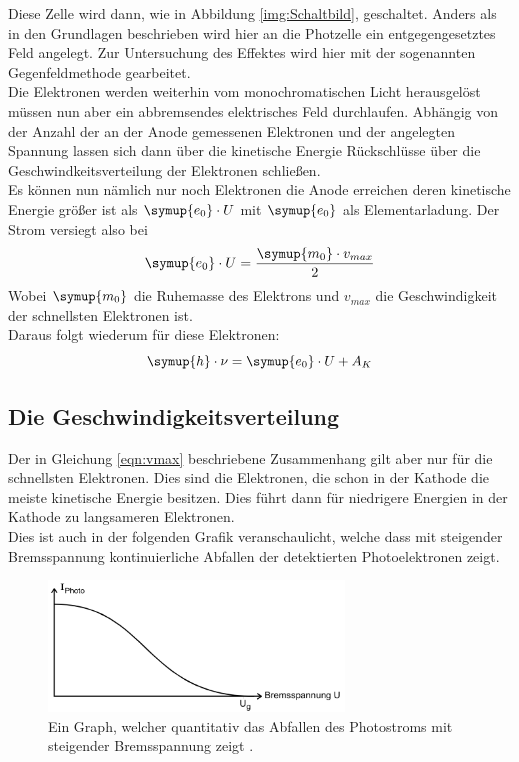     \noindent Diese Zelle wird dann, wie in Abbildung \ref{img:Schaltbild}, geschaltet.
    Anders als in den Grundlagen beschrieben wird hier an die Photzelle ein entgegengesetztes Feld angelegt.
    Zur Untersuchung des Effektes wird hier mit der sogenannten Gegenfeldmethode gearbeitet.\\
    Die Elektronen werden weiterhin vom monochromatischen Licht herausgelöst müssen nun aber ein abbremsendes elektrisches Feld durchlaufen.
    Abhängig von der Anzahl der an der Anode gemessenen Elektronen und der angelegten Spannung lassen sich dann über die kinetische Energie 
    Rückschlüsse über die Geschwindkeitsverteilung der Elektronen schließen.\\
    Es können nun nämlich nur noch Elektronen die Anode erreichen deren kinetische Energie größer ist als $\symup{e_0} \cdot U$ mit $\symup{e_0}$ als Elementarladung\cite{e0}.
    Der Strom versiegt also bei
    \begin{equation*}
        \symup{e_0} \cdot U= \frac{\symup{m_0}\cdot v_{max}}{2}
    \end{equation*}
    Wobei $\symup{m_0}$ die Ruhemasse des Elektrons \cite{m0} und $v_{max}$ die Geschwindigkeit der schnellsten Elektronen ist.\\
    Daraus folgt wiederum für diese Elektronen:
    \begin{equation}
        \symup{h}\cdot \nu= \symup{e_0} \cdot U + A_K
        \label{eqn:vmax}
    \end{equation}


    \subsection{Die Geschwindigkeitsverteilung}


    Der in Gleichung \ref{eqn:vmax} beschriebene Zusammenhang gilt aber nur für die schnellsten Elektronen.
    Dies sind die Elektronen, die schon in der Kathode die meiste kinetische Energie besitzen. 
    Dies führt dann für niedrigere Energien in der Kathode zu langsameren Elektronen.\\
    Dies ist auch in der folgenden Grafik veranschaulicht, welche dass mit steigender Bremsspannung kontinuierliche Abfallen der detektierten Photoelektronen zeigt.

    \begin{figure}[H]
        \centering
        \includegraphics[width=0.7\textwidth]{latex/images/Bremsspannung.PNG}
        \caption{Ein Graph, welcher quantitativ das Abfallen des Photostroms mit steigender Bremsspannung zeigt \protect \cite{500}.}
        \label{img:brems}
    \end{figure}

